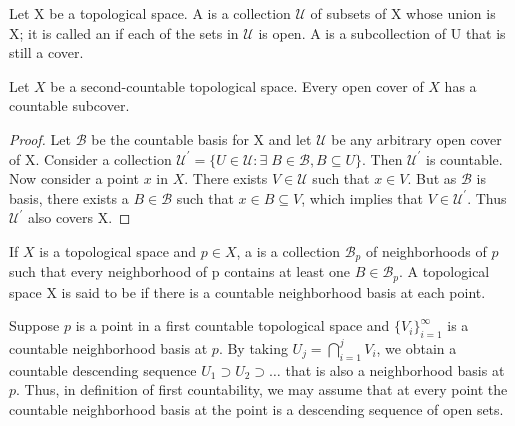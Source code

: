 \documentclass[11pt,a4paper]{article}
\begin{document}
\begin{mydef}
    Let X be a topological space. A  is a collection $\mathcal{U}$ of subsets of X whose union is X; it is called an  if each of the sets in $\mathcal{U}$ is open. A  is a subcollection of U that is still a cover.
\end{mydef}

\begin{prop}\label{prop:countable_subcover}
Let $X$ be a second-countable topological space. Every open cover of $X$ has a countable subcover.
\end{prop}

\begin{proof}
Let $\mathcal{B}$ be the countable basis for X and let $\mathcal{U}$ be any arbitrary open cover of X. Consider a collection $\mathcal{U}^\prime = \{U\in \mathcal{U}: \exists\; B\in \mathcal{B}, B\subseteq U\}$. Then $\mathcal{U}^\prime$ is countable. Now consider a point $x$ in $X$. There exists $V\in \mathcal{U}$ such that $x\in V$. But as $\mathcal{B}$ is basis, there exists a $B\in\mathcal{B}$ such that $x\in B\subseteq V$, which implies that $V\in \mathcal{U}^\prime$. Thus $\mathcal{U}^\prime$ also covers X.
\end{proof}

\begin{mydef}\label{def:first_countable_space}
If $X$ is a topological space and $p\in X$, a  is a collection $\mathcal{B}_p$ of neighborhoods of $p$ such that every neighborhood of p contains at least one $B\in \mathcal{B}_p$. A topological space X is said to be  if there is a countable neighborhood basis at each point. 
\end{mydef}

\begin{remark}\label{remark:descending_neighborhood_basis}
Suppose $p$ is a point in a first countable topological space and $\{V_i\}_{i=1}^\infty$ is a countable neighborhood basis at $p$. By taking $U_j = \bigcap_{i = 1}^j V_i$, we obtain a countable descending sequence $U_1\supset U_2\supset \ldots$ that is also a neighborhood basis at $p$. Thus, in definition of first countability, we may assume that at every point the countable neighborhood basis at the point is a descending sequence of open sets.
\end{remark}
\end{document}
